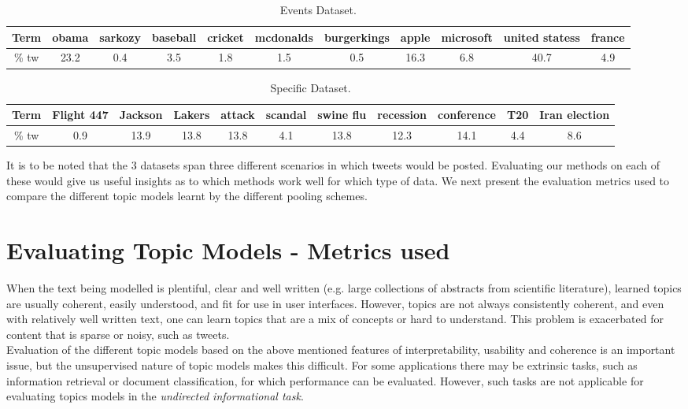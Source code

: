 \documentclass[10pt,a5paper,twoside]{article}
\begin{document}
\begin{table}[!h]
\setcounter{table}{1}
\centering

\resizebox{14cm}{!} 
{
	\begin{tabular}{|c|c|c|c|c|c|c|c|c|c|c|}
	\hline
	Term & obama & sarkozy & baseball & cricket & mcdonalds & burgerkings & apple & microsoft & united statess & france\\
	\hline
	\% tw & 23.2 & 0.4 & 3.5 & 1.8 & 1.5 & 0.5 & 16.3 & 6.8 & 40.7 & 4.9 \\
	\hline
	\end{tabular}
}
\caption{Events Dataset.}\label{Dataset}
\end{table}

\begin{table}[!h]
\setcounter{table}{2}
\centering
\resizebox{14cm}{!} 
{
	\begin{tabular}{|c|c|c|c|c|c|c|c|c|c|c|}
	\hline
	Term & Flight 447 & Jackson & Lakers & attack & scandal & swine flu & recession & conference & T20 & Iran election \\
	\hline
	\% tw & 0.9 & 13.9 & 13.8 & 13.8 & 4.1 & 13.8 & 12.3 & 14.1 & 4.4 & 8.6 \\
	\hline
	\end{tabular}
}
\caption{Specific Dataset.}\label{Table}
\end{table}

It is to be noted that the 3 datasets span three different scenarios in which  tweets would be posted. Evaluating our methods on each of these would give us useful insights as to which methods work well for which type of data. We next present the evaluation metrics used to compare the different topic models learnt by the different pooling schemes. \\


\section{Evaluating Topic Models - Metrics used}

When the text being modelled is plentiful, clear and well written (e.g. large
collections of abstracts from scientific literature), learned topics are usually coherent, easily understood, and fit for use in user interfaces. However, topics are not always consistently coherent, and even with relatively well written text, one can learn topics that are a mix of concepts or hard to understand. This problem is exacerbated for content that is sparse or noisy, such as tweets.
\\
Evaluation of the different topic models based on the above mentioned features of interpretability, usability and coherence is an important issue, but the unsupervised nature of topic models makes this difficult. For some applications there may be extrinsic tasks, such as information retrieval or document classification, for which performance can be evaluated. However, such tasks are not applicable for evaluating topics models in the {\it undirected informational task}. 
\\
\end{document}
